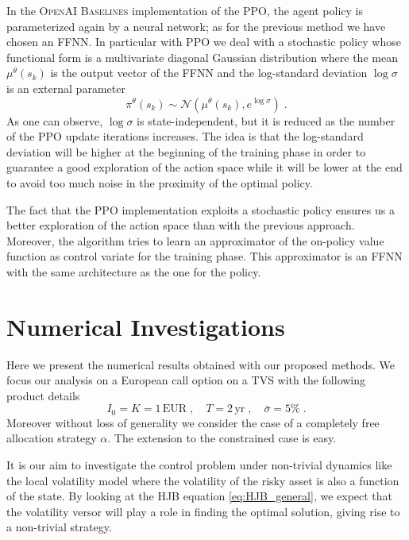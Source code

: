 \documentclass[11pt]{article}
\begin{document}
In the \textsc{OpenAI Baselines} implementation of the PPO, the agent policy is parameterized again by a neural network; as for the previous method we have chosen an FFNN. In particular with PPO we deal with a stochastic policy whose functional form is a multivariate diagonal Gaussian distribution where the mean $\mu^\theta(s_k)$ is the output vector of the FFNN and the log-standard deviation $\log\sigma$ is an external parameter
\begin{equation}
	\pi^\theta(s_k) \sim \mathcal{N}(\mu^\theta(s_k),e^{\log\sigma}) \; .
\end{equation}
As one can observe, $\log\sigma$ is state-independent, but it is reduced as the number of the PPO update iterations increases. The idea is that the log-standard deviation will be higher at the beginning of the training phase in order to guarantee a good exploration of the action space while it will be lower at the end to avoid too much noise in the proximity of the optimal policy.

The fact that the PPO implementation exploits a stochastic policy ensures us a better exploration of the action space than with the previous approach. Moreover, the algorithm tries to learn an approximator of the on-policy value function as control variate for the training phase. This approximator is an FFNN with the same architecture as the one for the policy.


\section{Numerical Investigations}\label{sec:Numerical_investigations}
Here we present the numerical results obtained with our proposed methods. We focus our analysis on a European call option on a TVS with the following product details
\begin{equation}\nonumber
	I_0 = K = 1 \, \text{EUR} \; , \quad T=2 \, \text{yr} \; , \quad \bar{\sigma} = 5\% \; .
\end{equation}
Moreover without loss of generality we consider the case of a completely free allocation strategy $\alpha$. The extension to the constrained case is easy.

It is our aim to investigate the control problem under non-trivial dynamics like the local volatility model where the volatility of the risky asset is also a function of the state. By looking at the HJB equation \eqref{eq:HJB_general}, we expect that the volatility versor will play a role in finding the optimal solution, giving rise to a non-trivial strategy.
\end{document}
